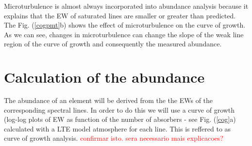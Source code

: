 \documentclass[dvips,12pt,a4paper]{report}
\begin{document}
{Microturbulence is almost always incorporated into abundance analysis because it explains that the EW of saturated lines are smaller or greater than predicted. The Fig. (\ref{cogpmt}b) shows the effect of microturbulence on the curve of growth. As we can see, changes in microturbulence can change the slope of the weak line region of the curve of growth and consequently the measured abundance. 








\section{Calculation of the abundance}
\label{calab}

The abundance of an element will be derived from the the EWs of the corresponding spectral lines. In order to do this we will  use a curve of growth (log-log plots of EW as function of the number of absorbers - see Fig. (\ref{cog}a) calculated with a LTE model atmosphere for each line. This is reffered to as curve of growth analysis. \textcolor{red}{confirmar isto. sera necessario mais explicacoes?}

}
\end{document}
